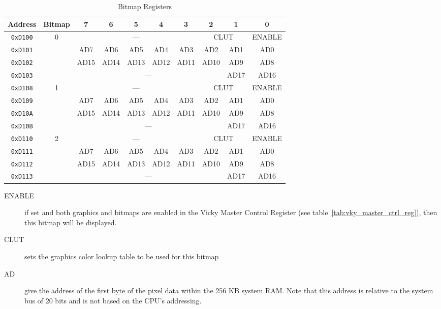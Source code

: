 \begin{table}[h]
    \begin{center}
        \begin{tabular}{|c|c|c|c|c|c|c|c|c|c|} \hline
            Address & Bitmap & 7 & 6 & 5 & 4 & 3 & 2 & 1 & 0 \\ \hline\hline
            \verb+0xD100+ & \multirow{4}{*}{0} & \multicolumn{5}{|c|}{---} & \multicolumn{2}{|c|}{CLUT} & ENABLE \\\cline{1-1}\cline{3-10}
            \verb+0xD101+ & & AD7 & AD6 & AD5 & AD4 & AD3 & AD2 & AD1 & AD0 \\\cline{1-1}\cline{3-10}
            \verb+0xD102+ & & AD15 & AD14 & AD13 & AD12 & AD11 & AD10 & AD9 & AD8 \\\cline{1-1}\cline{3-10}
            \verb+0xD103+ & & \multicolumn{6}{|c|}{---} & AD17 & AD16 \\ \hline
            
            \verb+0xD108+ & \multirow{4}{*}{1} & \multicolumn{5}{|c|}{---} & \multicolumn{2}{|c|}{CLUT} & ENABLE \\\cline{1-1}\cline{3-10}
            \verb+0xD109+ & & AD7 & AD6 & AD5 & AD4 & AD3 & AD2 & AD1 & AD0 \\\cline{1-1}\cline{3-10}
            \verb+0xD10A+ & & AD15 & AD14 & AD13 & AD12 & AD11 & AD10 & AD9 & AD8 \\\cline{1-1}\cline{3-10}
            \verb+0xD10B+ & & \multicolumn{6}{|c|}{---} & AD17 & AD16 \\ \hline

            \verb+0xD110+ & \multirow{4}{*}{2} & \multicolumn{5}{|c|}{---} & \multicolumn{2}{|c|}{CLUT} & ENABLE \\\cline{1-1}\cline{3-10}
            \verb+0xD111+ & & AD7 & AD6 & AD5 & AD4 & AD3 & AD2 & AD1 & AD0 \\\cline{1-1}\cline{3-10}
            \verb+0xD112+ & & AD15 & AD14 & AD13 & AD12 & AD11 & AD10 & AD9 & AD8 \\\cline{1-1}\cline{3-10}
            \verb+0xD113+ & & \multicolumn{6}{|c|}{---} & AD17 & AD16 \\ \hline
        \end{tabular}
    \end{center}
    \caption{Bitmap Registers}
    \label{tab:bm_registers}
\end{table}

\begin{description}
    \item[ENABLE] if set and both graphics and bitmaps are enabled in the Vicky Master Control Register (see table~\ref{tab:vky_master_ctrl_reg}), then this bitmap will be displayed.

    \item[CLUT] sets the graphics color lookup table to be used for this bitmap

    \item[AD] give the address of the first byte of the pixel data within the 256 KB system RAM. Note that this address is relative to the system bus of 20 bits and is not based on the CPU's addressing.
\end{description}

